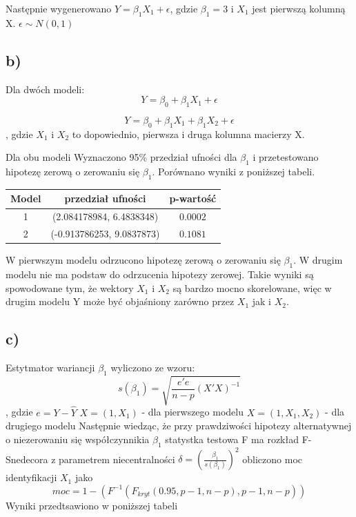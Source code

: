 \documentclass[9pt]{article}  %
\begin{document}
  Następnie wygenerowano $Y = \beta_1 X_1 + \epsilon$, gdzie $\beta_1 = 3$ i $X_1$ jest pierwszą kolumną X. $\epsilon \sim N(0,1)$
  \subsection{b)}
  
  Dla dwóch modeli:
  \begin{equation}
  Y = \beta_0 + \beta_1 X_1 + \epsilon 
  \end{equation}
  
  \begin{equation}
  Y = \beta_0 + \beta_1 X_1 + \beta_1 X_2 + \epsilon 
  \end{equation}
  , gdzie $X_1$ i $X_2$ to dopowiednio, pierwsza i druga kolumna macierzy X.
  
  
  Dla obu modeli Wyznaczono 95\% przedział ufności dla $\beta_1$ i przetestowano hipotezę zerową o zerowaniu się $\beta_1$. Porównano wyniki z poniższej tabeli.
  
    \begin{table}[H]
  \centering
    \begin{tabular}{c|c|c}
     Model & przedział ufności & p-wartość \\
         \hline
     1 & (2.084178984, 6.4838348) & $0.0002$ \\
     2 & (-0.913786253, 9.0837873) & $0.1081 $ \\
  \end{tabular} 
  \end{table}
  
  W pierwszym modelu odrzucono hipotezę zerową o zerowaniu się $\beta_1$. W drugim modelu nie ma podstaw do odrzucenia hipotezy zerowej. Takie wyniki są spowodowane tym, że wektory $X_1$ i $X_2$ są bardzo mocno skorelowane, więc w drugim modelu Y może być objaśniony zarówno przez $X_1$ jak i $X_2$.
  
  \subsection{c)}
  
  Estytmator wariancji $\beta_1$ wyliczono ze wzoru:
  $$s(\beta_1) = \sqrt{ \frac{e'e}{n-p} (X'X)^{-1}  }$$
  , gdzie \newline
  $e = Y - \hat{Y} $ \newline
  $ X = (1, X_1)$ - dla pierwszego modelu \newline
  $ X = (1,X_1, X_2)$ - dla drugiego modelu \newline
  Następnie wiedząc, że przy prawdziwości hipotezy alternatywnej o niezerowaniu się współczynnikia $\beta_1$ statystka testowa F ma rozkład F-Snedecora z parametrem niecentralności $\delta = (\frac{\beta_1}{s(\beta_1)})^2$ obliczono moc identyfikacji $X_1$ jako 
  $$ moc = 1-(F^{-1}( F_{kryt}(0.95, p-1,n-p)  ,p-1, n-p ) )  $$ 
  Wyniki przedtsawiono w poniższej tabeli
  
\end{document}
